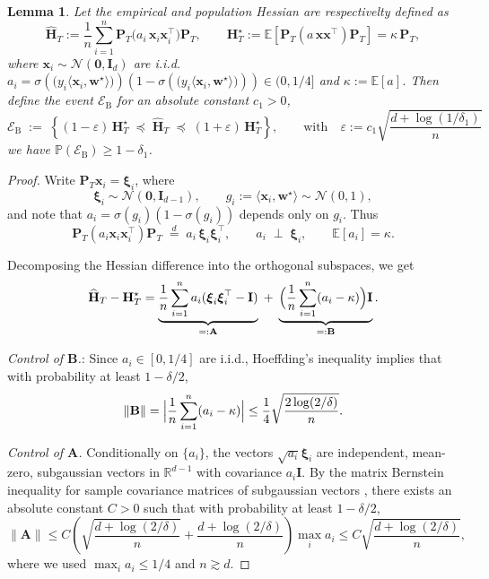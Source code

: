 \documentclass{article}
\theoremstyle{plain}
\newtheorem{lemma}[theorem]{Lemma}
\theoremstyle{definition}
\theoremstyle{remark}
\begin{document}
{\begin{lemma}
\label{lem:tangent_hessian_concentration}
Let the empirical and population Hessian are respectivelty defined as 
\[
\widehat{\mathbf H}_T
:=
\frac{1}{n}\sum_{i=1}^n
\mathbf P_T\!\bigl(a_i\,\mathbf x_i\mathbf x_i^\top\bigr)\mathbf P_T,
\qquad
\mathbf H_T^\star
:=
\mathbb E\!\left[\mathbf P_T(a\,\mathbf x\mathbf x^\top)\mathbf P_T\right]
= \kappa\,\mathbf P_T,
\]
where $\mathbf x_i\sim\mathcal N(\mathbf 0,\mathbf I_d)$ are i.i.d. $a_i= \sigma(\bigl(y_i\langle\mathbf x_i,\mathbf w^\star\rangle\bigr))(1-\sigma(\bigl(y_i\langle\mathbf x_i,\mathbf w^\star\rangle\bigr)))\in(0,1/4]$ and $\kappa:=\mathbb E[a]$. Then define the event $\mathcal E_{\mathrm B}$ for an absolute constant $c_{1}>0$, 
\begin{equation}
\mathcal E_{\mathrm B}
\;:=\;
\left\{
(1-\varepsilon)\,\mathbf H_T^\star
\;\preceq\;
\widehat{\mathbf H}_T
\;\preceq\;
(1+\varepsilon)\,\mathbf H_T^\star
\right\},
\qquad  \text{with} \quad 
\varepsilon
:=
c_{1}\sqrt{\frac{d+\log(1/\delta_{1})}{n}}
\end{equation}
we have $\mathbb P(\mathcal E_{\mathrm B})\geq 1-\delta_{1}$. 
\end{lemma}

\begin{proof}
Write $\mathbf P_T\mathbf x_i=\boldsymbol\xi_i$, where
\[
\boldsymbol\xi_i\sim\mathcal N(\mathbf 0,\mathbf I_{d-1}),
\qquad
g_i:=\langle\mathbf x_i,\mathbf w^\star\rangle\sim\mathcal N(0,1),
\]
and note that $a_i=\sigma(g_i)(1-\sigma(g_i))$ depends only on $g_i$.
Thus
\[
\mathbf P_T(a_i\mathbf x_i\mathbf x_i^\top)\mathbf P_T
\;\stackrel d=\;
a_i\,\boldsymbol\xi_i\boldsymbol\xi_i^\top,
\qquad
a_i\;\perp\;\boldsymbol\xi_i,
\qquad
\mathbb E[a_i]=\kappa.
\]

Decomposing the Hessian difference into the orthogonal subspaces, we get 
\[
\widehat{\mathbf H}_T-\mathbf H_T^\star
=
\underbrace{\frac1n\sum_{i=1}^n a_i(\boldsymbol\xi_i\boldsymbol\xi_i^\top-\mathbf I)}_{=: \mathbf A}
\;+\;
\underbrace{\Bigl(\frac1n\sum_{i=1}^n(a_i-\kappa)\Bigr)\mathbf I}_{=: \mathbf B}.
\]

\emph{Control of $\mathbf B$.}: 
Since $a_i\in[0,1/4]$ are i.i.d., Hoeffding’s inequality implies that
with probability at least $1-\delta/2$,
\[
\|\mathbf B\|
=
\Bigl|\frac1n\sum_{i=1}^n(a_i-\kappa)\Bigr|
\le
\frac14\sqrt{\frac{2\log(2/\delta)}{n}}.
\]

\emph{Control of $\mathbf A$.}
Conditionally on $\{a_i\}$, the vectors $\sqrt{a_i}\boldsymbol\xi_i$
are independent, mean-zero, subgaussian vectors in $\mathbb R^{d-1}$
with covariance $a_i\mathbf I$.
By the matrix Bernstein inequality for sample covariance matrices
of subgaussian vectors \cite{vershynin2018high},
there exists an absolute constant $C>0$ such that with probability
at least $1-\delta/2$,
\[
\|\mathbf A\|
\le
C\left(
\sqrt{\frac{d+\log(2/\delta)}{n}}
+
\frac{d+\log(2/\delta)}{n}
\right)\max_i a_i
\le
C\sqrt{\frac{d+\log(2/\delta)}{n}},
\]
where we used $\max_i a_i\le 1/4$ and $n\gtrsim d$.


\end{proof}}
\end{document}
